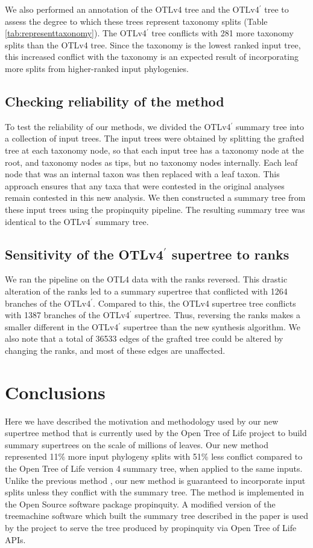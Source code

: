 \documentclass[fleqn,12pt,lineno,english]{wlpeerj}
\newcommand{\otl}{OTLv4}
\newcommand{\otlprop}{OTLv4$^\prime$}
\begin{document}
We also performed an annotation of the \otl{} tree and the \otlprop{}
tree to assess the degree to which these trees represent taxonomy
splits (Table \ref{tab:representtaxonomy}).  The \otlprop{} tree
conflicts with 281 more taxonomy splits than the \otl{} tree.  Since
the taxonomy is the lowest ranked input tree, this increased conflict
with the taxonomy is an expected result of incorporating more splits
from higher-ranked input phylogenies.  

\subsection{Checking reliability of the method}
To test the reliability of our methods, we divided the \otlprop{} summary
tree into a collection of input trees. The input trees were obtained
by splitting the grafted tree at each taxonomy node, so that each
input tree has a taxonomy node at the root, and taxonomy nodes as
tips, but no taxonomy nodes internally.  Each leaf node that was an
internal taxon was then replaced with a leaf taxon. This approach
ensures that any taxa that were contested in the original analyses
remain contested in this new analysis.  We then constructed a summary
tree from these input trees using the propinquity pipeline.  The
resulting summary tree was identical to the \otlprop{} summary tree.

\subsection{Sensitivity of the \otlprop{} supertree to ranks}
We ran the pipeline on the OTL4 data with the ranks reversed.  This drastic alteration of the ranks led to a summary supertree that conflicted with 1264 branches of the \otlprop{}.  Compared to this, the \otl{} supertree tree conflicts with 1387 branches of the \otlprop{} supertree.  Thus, reversing the ranks makes a smaller different in the \otlprop{} supertree than the new synthesis algorithm.  We also note that a total of 36533 edges of the grafted tree could be altered by changing the ranks, and most of these edges are unaffected.

\section{Conclusions}

Here we have described the motivation and methodology used by our new
supertree method that is currently used by the Open Tree of Life
project to build summary supertrees on the scale of millions of leaves.
Our new method represented 11\% more input phylogeny splits with 51\%
less conflict compared to the Open Tree of Life version 4 summary
tree, when applied to the same inputs. Unlike the previous method
\citep{HinchliffEtAl2015}, our new method is guaranteed to incorporate
input splits unless they conflict with the summary tree. The method is
implemented in the Open Source software package propinquity.  A
modified version of the treemachine software which built the summary
tree described in the \citet{HinchliffEtAl2015} paper is used by the
project to serve the tree produced by propinquity via Open Tree of
Life APIs.
\end{document}
